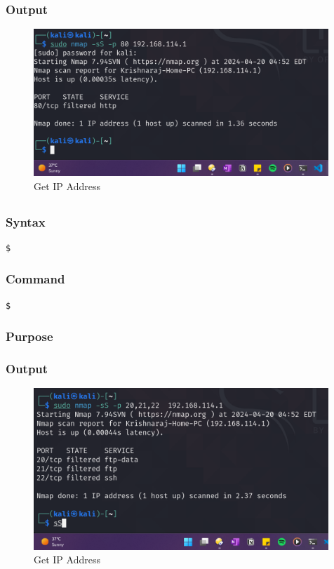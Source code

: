 \documentclass[11pt]{article}
\begin{document}
\subsubsection*{Output}
\begin{figure}[H]
    \centering
    \includegraphics[width=0.99\textwidth]{a3_ss (5).png}
    \caption{Get IP Address}
    \label{fig:1}
\end{figure}
\subsection{}

\subsubsection*{Syntax}
\begin{verbatim}
$
\end{verbatim}

\subsubsection*{Command}
\begin{verbatim}
$
\end{verbatim}

\subsubsection*{Purpose}

\subsubsection*{Output}
\begin{figure}[H]
    \centering
    \includegraphics[width=0.99\textwidth]{a3_ss (6).png}
    \caption{Get IP Address}
    \label{fig:1}
\end{figure}
\end{document}

